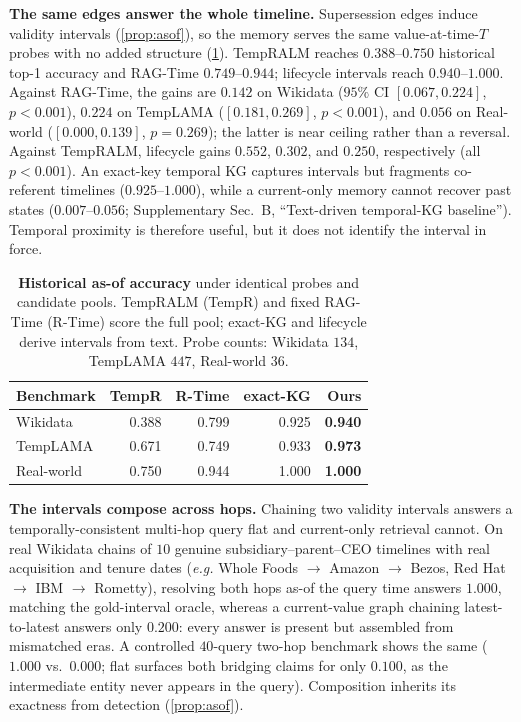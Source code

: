 \documentclass[letterpaper]{article}
\theoremstyle{plain}
\newcommand{\eg}{\emph{e.g.}}
\begin{document}
\noindent\textbf{The same edges answer the whole timeline.} Supersession edges induce validity intervals (\cref{prop:asof}), so the memory serves the same value-at-time-$T$ probes with no added structure (\cref{tab:asof}). TempRALM reaches $0.388$--$0.750$ historical top-1 accuracy and RAG-Time $0.749$--$0.944$; lifecycle intervals reach $0.940$--$1.000$. Against RAG-Time, the gains are $0.142$ on Wikidata ($95\%$ CI $[0.067,0.224]$, $p<0.001$), $0.224$ on TempLAMA ($[0.181,0.269]$, $p<0.001$), and $0.056$ on Real-world ($[0.000,0.139]$, $p{=}0.269$); the latter is near ceiling rather than a reversal. Against TempRALM, lifecycle gains $0.552$, $0.302$, and $0.250$, respectively (all $p<0.001$). An exact-key temporal KG captures intervals but fragments co-referent timelines ($0.925$--$1.000$), while a current-only memory cannot recover past states ($0.007$--$0.056$; Supplementary Sec.~B, ``Text-driven temporal-KG baseline''). Temporal proximity is therefore useful, but it does not identify the interval in force.

\begin{table}[t]
\centering
\footnotesize
\begin{tabular*}{\columnwidth}{@{\extracolsep{\fill}}lrrrr@{}}
\toprule
Benchmark & TempR & R-Time & exact-KG & \textbf{Ours} \\
\midrule
Wikidata & 0.388 & 0.799 & 0.925 & \textbf{0.940} \\
TempLAMA & 0.671 & 0.749 & 0.933 & \textbf{0.973} \\
Real-world & 0.750 & 0.944 & 1.000 & \textbf{1.000} \\
\bottomrule
\end{tabular*}
\caption{\textbf{Historical as-of accuracy} under identical probes and candidate pools. TempRALM (TempR) and fixed RAG-Time (R-Time) score the full pool; exact-KG and lifecycle derive intervals from text. Probe counts: Wikidata $134$, TempLAMA $447$, Real-world $36$.}
\label{tab:asof}
\end{table}

\noindent\textbf{The intervals compose across hops.} Chaining two validity intervals answers a temporally-consistent multi-hop query flat and current-only retrieval cannot. On real Wikidata chains of $10$ genuine subsidiary--parent--CEO timelines with real acquisition and tenure dates (\eg{} Whole Foods $\to$ Amazon $\to$ Bezos, Red Hat $\to$ IBM $\to$ Rometty), resolving both hops as-of the query time answers $1.000$, matching the gold-interval oracle, whereas a current-value graph chaining latest-to-latest answers only $0.200$: every answer is present but assembled from mismatched eras. A controlled $40$-query two-hop benchmark shows the same ($1.000$ vs.\ $0.000$; flat surfaces both bridging claims for only $0.100$, as the intermediate entity never appears in the query). Composition inherits its exactness from detection (\cref{prop:asof}).
\end{document}
